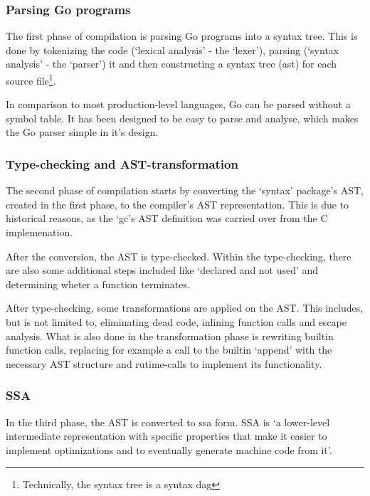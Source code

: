 \subsubsection{Parsing Go programs}


The first phase of compilation is parsing Go programs into a syntax tree. This
is done by tokenizing the code (`lexical analysis' - the `lexer'), parsing
(`syntax analysis' - the `parser') it and then constructing a syntax tree (\gls{ast}) for
each source file\footnote{Technically, the syntax tree is a syntax \gls{dag}\autocite{ast-node-dag}}.

In comparison to most production-level languages, Go can be parsed without a
symbol table. It has been designed to be easy to parse
and analyse, which makes the Go parser simple in it's design\autocite{go-faq-symbol}.

\subsubsection{Type-checking and AST-transformation}\label{sec:comp-type}

The second phase of compilation starts by converting the `syntax' package's
AST, created in the first phase, to the compiler's AST representation. This
is due to historical reasons, as the `gc's AST definition was carried over
from the C implemenation.

After the conversion, the AST is type-checked. Within the type-checking, there
are also some additional steps included like `declared and not used' and
determining wheter a function terminates.

After type-checking, some transformations are applied on the AST. This includes,
but is not limited to, eliminating dead code, inlining function calls and escape
analysis. What is also done in the transformation phase is rewriting builtin function
calls, replacing for example a call to the builtin `append' with the necessary
AST structure and rutime-calls to implement its functionality.

\subsubsection{SSA}

In the third phase, the AST is converted to \gls{ssa} form. SSA  is `a
lower-level intermediate representation with specific properties that make it
easier to implement optimizations and to eventually generate machine code from
it'\autocite{compiler-readme}.

